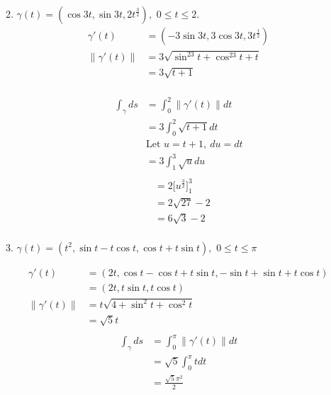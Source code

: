 \documentclass{article}
\newcommand{\norm}[1]{\| #1 \|}
\begin{document}
\begin{enumerate}
\begin{enumerate}
\begin{multicols}{2}
    \end{multicols}
    \item $\displaystyle \gamma(t) = (\cos 3t ,\sin 3t ,2t^{\frac{3}{2}}),$ $0 \leq t \leq 2$.
    \begin{align*} 
        \gamma'(t) &= (-3\sin3t,3\cos3t,3t^\frac{1}{2}) \\
        \norm{\gamma'(t)} &= 3\sqrt{\sin^23t+\cos^23t+t} \\
        &= 3\sqrt{t + 1} \\
    \end{align*}
    \begin{multicols}{2} 
    \noindent
    \begin{align*}
        \int_\gamma ds &= \int_0^2 \norm{\gamma'(t)} dt \\
        &= 3\int_0^2 \sqrt{t+1} dt \\
        &\text{Let } u = t + 1,\: du = dt \\
        &= 3\int_1^3 \sqrt{u} du \\
    \end{align*}
    \begin{align*}
        &= 2\Big[u^\frac{3}{2}\Big]_1^3 \\
        &= 2\sqrt{27} - 2 \\
        &= 6\sqrt{3} - 2 \\
    \end{align*}
    \end{multicols}
    \item $\displaystyle \gamma(t) = (t^2, \sin t - t\cos t, \cos t + t\sin t),$ $0 \leq t \leq \pi$
    \begin{multicols}{2} 
    \noindent
    \begin{align*} 
        \gamma'(t) &= (2t,\cos t-\cos t+t\sin t, -\sin t+\sin t+t\cos t) \\
        &= (2t,t\sin t,t\cos t) \\
        \norm{\gamma'(t)} &= t\sqrt{4 + \sin^2t+\cos^2t} \\
        &= \sqrt{5}t \\
    \end{align*}
    \begin{align*}
        \int_\gamma ds &= \int_0^\pi \norm{\gamma'(t)} dt \\
        &= \sqrt{5}\int_0^\pi t dt \\
        &= \frac{\sqrt{5}\pi^2}{2}
    \end{align*}
    \end{multicols}
\end{enumerate}

\end{enumerate}
\end{document}
